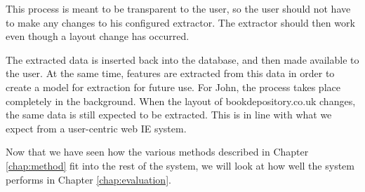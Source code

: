 This process is meant to be transparent to the user, so the user should not have to make
any changes to his configured extractor. The extractor should then work even though a layout 
change has occurred.

	The extracted data is inserted back into the database, and then made available to the user.
At the same time, features are extracted from this data in order to create a model for
extraction for future use.  For John, the process takes place completely in the background.
When the layout of bookdepository.co.uk changes, the same data is still expected to be extracted.
This is in line with what we expect from a user-centric web IE system.

	Now that we have seen how the various methods described in Chapter \ref{chap:method} 
fit into the rest of the system, we will look at how well the system performs in 
Chapter \ref{chap:evaluation}.
